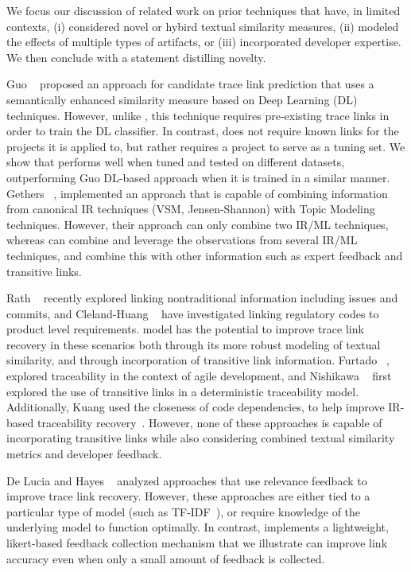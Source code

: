We focus our discussion of related work on prior techniques that have, in limited contexts, (i) considered novel or hybird textual similarity measures, (ii) modeled the effects of multiple types of artifacts, or (iii) incorporated developer expertise. We then conclude with a statement distilling \Comets novelty.

 Guo \etal~\citep{Guo:ICSE'17} proposed an approach for candidate trace link prediction that uses a semantically enhanced similarity measure based on Deep Learning (DL) techniques. However, unlike \Comet, this technique requires pre-existing trace links in order to train the DL classifier.  In contrast, \Comet does not require known links for the projects it is applied to, but rather requires a project to serve as a tuning set. We show that \Comet performs well when tuned and tested on different datasets, outperforming Guo \etals DL-based approach when it is trained in a similar manner. Gethers \etal~\citep{Gethers:ICSM'11}, implemented an approach that is capable of combining information from canonical IR techniques (\ie VSM, Jensen-Shannon) with Topic Modeling techniques. However, their approach can only combine two IR/ML techniques, whereas \Comet can combine and leverage the observations from several IR/ML techniques, and combine this with other information such as expert feedback and transitive links. 

 Rath \etal~\citep{Rath:ICSE'18} recently explored linking nontraditional information including issues and commits, and Cleland-Huang \etal~\cite{Cleland-Huang:ICSE'10} have investigated linking regulatory codes to product level requirements.  \Comets model has the potential to improve trace link recovery in these scenarios both through its more robust modeling of textual similarity, and through incorporation of transitive link information. Furtado \etal~\cite{Furtado:RE'16}, explored traceability in the context of agile development, and Nishikawa \etal~\cite{Nishikawa:ICSME'15} first explored the use of transitive links in a deterministic traceability model. Additionally, Kuang \etal used the closeness of code dependencies, to help improve IR-based traceability recovery~\cite{Kuang:SANER'17}. However, none of these approaches is capable of incorporating transitive links while also considering combined textual similarity metrics and developer feedback.

 De Lucia \etal \citep{DeLucia:ICSM'06} and Hayes \etal~\citep{Hayes:TSE'06} analyzed approaches that use relevance feedback to improve trace link recovery. However, these approaches are either tied to a particular type of model (such as TF-IDF~\citep{DeLucia:ICSM'06}), or require knowledge of the underlying model to function optimally. In contrast, \Comet implements a lightweight, likert-based feedback collection mechanism that we illustrate can improve link accuracy even when only a small amount of feedback is collected.
 
